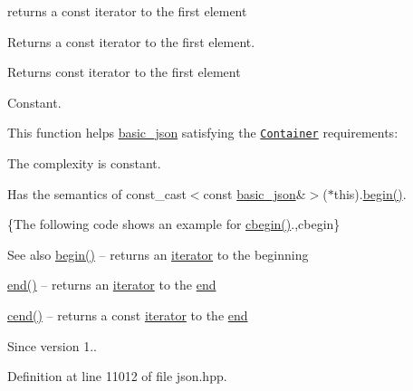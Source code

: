 returns a const iterator to the first element 

Returns a const iterator to the first element.

 \begin{DoxyReturn}{Returns}
const iterator to the first element
\end{DoxyReturn}
Constant.

This function helps {\ttfamily \hyperlink{classnlohmann_1_1basic__json}{basic\+\_\+json}} satisfying the \href{http://en.cppreference.com/w/cpp/concept/Container}{\tt Container} requirements\+:
\begin{DoxyItemize}
\item The complexity is constant.
\item Has the semantics of {\ttfamily const\+\_\+cast$<$const \hyperlink{classnlohmann_1_1basic__json}{basic\+\_\+json}\&$>$($\ast$this).\hyperlink{classnlohmann_1_1basic__json_a0ff28dac23f2bdecee9564d07f51dcdc}{begin()}}.
\end{DoxyItemize}

\{The following code shows an example for {\ttfamily \hyperlink{classnlohmann_1_1basic__json_ad865d6c291b237ae508d5cb2146b5877}{cbegin()}}.,cbegin\}

\begin{DoxySeeAlso}{See also}
\hyperlink{classnlohmann_1_1basic__json_a0ff28dac23f2bdecee9564d07f51dcdc}{begin()} -- returns an \hyperlink{classnlohmann_1_1basic__json_a099316232c76c034030a38faa6e34dca}{iterator} to the beginning 

\hyperlink{classnlohmann_1_1basic__json_a13e032a02a7fd8a93fdddc2fcbc4763c}{end()} -- returns an \hyperlink{classnlohmann_1_1basic__json_a099316232c76c034030a38faa6e34dca}{iterator} to the \hyperlink{classnlohmann_1_1basic__json_a13e032a02a7fd8a93fdddc2fcbc4763c}{end} 

\hyperlink{classnlohmann_1_1basic__json_a8dba7b7d2f38e6b0c614030aa43983f6}{cend()} -- returns a const \hyperlink{classnlohmann_1_1basic__json_a099316232c76c034030a38faa6e34dca}{iterator} to the \hyperlink{classnlohmann_1_1basic__json_a13e032a02a7fd8a93fdddc2fcbc4763c}{end}
\end{DoxySeeAlso}
\begin{DoxySince}{Since}
version 1.. 
\end{DoxySince}


Definition at line 11012 of file json.\+hpp.

